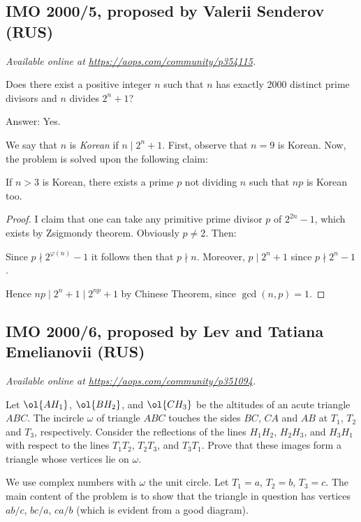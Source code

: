 \documentclass[11pt]{scrartcl}
\begin{document}
\subsection{IMO 2000/5, proposed by Valerii Senderov (RUS)}
\textsl{Available online at \url{https://aops.com/community/p354115}.}
\begin{mdframed}[style=mdpurplebox,frametitle={Problem statement}]
Does there exist a positive integer $n$
such that $n$ has exactly 2000 distinct prime divisors
and $n$ divides $2^n + 1$?
\end{mdframed}
Answer: Yes.

We say that $n$ is \emph{Korean} if $n \mid 2^n+1$.
First, observe that $n=9$ is Korean.
Now, the problem is solved upon the following claim:
\begin{claim*}
  If $n > 3$ is Korean,
  there exists a prime $p$ not dividing $n$
  such that $np$ is Korean too.
\end{claim*}
\begin{proof}
  I claim that one can take any primitive prime divisor $p$ of $2^{2n}-1$,
  which exists by Zsigmondy theorem.
  Obviously $p \neq 2$.
  Then:
  \begin{itemize}
    \ii Since $p \nmid 2^{\varphi(n)}-1$ it follows then that $p \nmid n$.
    \ii Moreover, $p \mid 2^n+1$ since $p \nmid 2^n-1$.
  \end{itemize}
  Hence $np \mid 2^n+1 \mid 2^{np} + 1$ by Chinese Theorem,
  since $\gcd(n,p) = 1$.
\end{proof}
\pagebreak

\subsection{IMO 2000/6, proposed by Lev and Tatiana Emelianovii (RUS)}
\textsl{Available online at \url{https://aops.com/community/p351094}.}
\begin{mdframed}[style=mdpurplebox,frametitle={Problem statement}]
Let $\ol{AH_1}$, $\ol{BH_2}$, and $\ol{CH_3}$ be the
altitudes of an acute triangle $ABC$.
The incircle $\omega$ of triangle $ABC$ touches the sides
$BC$, $CA$ and $AB$ at $T_1$, $T_2$ and $T_3$, respectively.
Consider the reflections of the lines $H_1H_2$, $H_2H_3$, and
$H_3H_1$ with respect to the lines $T_1T_2$, $T_2T_3$, and $T_3T_1$.
Prove that these images form a triangle whose vertices lie on $\omega$.
\end{mdframed}
We use complex numbers with $\omega$ the unit circle.
Let $T_1 = a$, $T_2 = b$, $T_3 = c$.
The main content of the problem is to show that
the triangle in question has vertices
$ab/c$, $bc/a$, $ca/b$
(which is evident from a good diagram).
\end{document}
